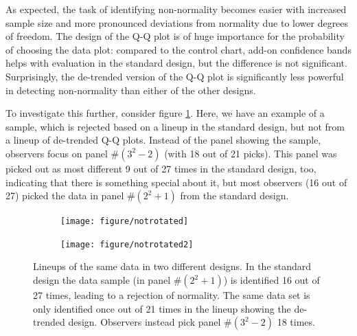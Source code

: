 \documentclass{article}\usepackage[]{graphicx}\usepackage[]{color}
\newenvironment{knitrout}{}{} %
\newcommand{\hh}[1]{{\color{magenta} #1}}
\begin{document}
%
As expected, the task of identifying non-normality becomes easier with increased sample size and more pronounced deviations from normality due to lower degrees of freedom. The  design of the Q-Q plot is of huge importance for the probability of choosing the data plot: compared to the control chart, add-on confidence bands helps with evaluation in the standard design, but the difference is not significant.  Surprisingly, the de-trended version of the Q-Q plot is significantly less powerful in detecting non-normality than either of the other designs. 

\hh{To investigate this further, consider figure \ref{fig:rotstd}. Here, we have an example of a sample, which is rejected based on a  lineup in the standard design, but not from a lineup of de-trended Q-Q plots. Instead of the panel showing the sample, observers focus on panel \#$(3^2-2)$ (with 18 out of 21 picks). This panel was picked out as most different 9 out of 27 times in the standard design, too, indicating that there is something special about it, but most observers (16 out of 27) picked the data in panel \#$(2^2+1)$ from the standard design. }
\begin{figure}[hbt]
\begin{subfigure}{0.5\textwidth}
\begin{knitrout}
\color{fgcolor}
\texttt{[image: figure/notrotated]} 

\end{knitrout}

\end{subfigure}
\begin{subfigure}{0.5\textwidth}
\begin{knitrout}
\color{fgcolor}
\texttt{[image: figure/notrotated2]} 

\end{knitrout}

\end{subfigure}
\caption{\label{fig:rotstd}Lineups of the same data in two different designs. In the standard design the data sample (in panel \#$(2^2+1)$) is identified 16 out of 27 times, leading to a rejection of normality. The same data set is only identified once out of 21 times in the lineup showing the de-trended design. Observers instead pick panel \#$(3^2-2)$ 18 times. }
\end{figure}
\end{document}
